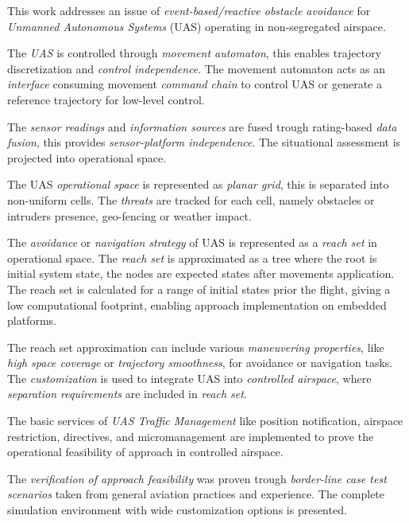 \noindent This work addresses an issue of \emph{event-based/reactive obstacle avoidance} for \emph{Unmanned Autonomous Systems} (UAS) operating in non-segregated airspace. 

The \emph{UAS} is controlled through \emph{movement automaton}, this enables trajectory discretization and \emph{control independence}. The movement automaton acts as an \emph{interface} consuming movement \emph{command chain} to control UAS or generate a reference trajectory for low-level control.

The \emph{sensor readings} and \emph{information sources} are fused trough rating-based \emph{data fusion}, this provides \emph{sensor-platform independence}. The situational assessment is projected into operational space.

The UAS \emph{operational space} is represented as \emph{planar grid}, this is separated into non-uniform cells. The \emph{threats} are tracked for each cell, namely obstacles or intruders presence, geo-fencing or weather impact. 

The \emph{avoidance} or \emph{navigation strategy} of UAS is represented as a \emph{reach set} in operational space. The \emph{reach set} is approximated as a tree where the root is initial system state, the nodes are expected states after movements application. The reach set is calculated for a range of initial states prior the flight, giving a low computational footprint, enabling approach implementation on embedded platforms. 

The reach set approximation can include various \emph{maneuvering properties}, like \emph{high space coverage} or \emph{trajectory smoothness}, for avoidance or navigation tasks. The \emph{customization} is used to integrate UAS into \emph{controlled airspace}, where \emph{separation requirements} are included in \emph{reach set}.

The basic services of \emph{UAS Traffic Management} like position notification, airspace restriction, directives, and micromanagement are implemented to prove the operational feasibility of approach in controlled airspace. 

The \emph{verification of approach feasibility} was proven trough \emph{border-line case test scenarios} taken from general aviation practices and experience. The complete simulation environment with wide customization options is presented.